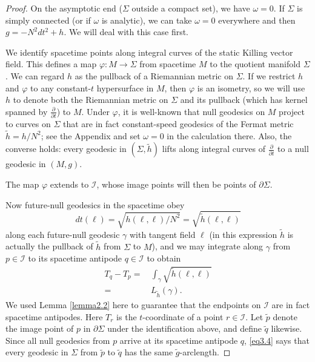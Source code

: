 \documentclass[12pt]{amsart}
\numberwithin{equation}{section}
\begin{document}
\begin{proof}
On the asymptotic end ($\Sigma$ outside a compact set), we have $\omega=0$. If $\Sigma$ is simply connected (or if $\omega$ is analytic), we can take $\omega=0$ everywhere and then $g=-N^2dt^2+h$. We will deal with this case first.

We identify spacetime points along integral curves of the static Killing vector field. This defines a map $\varphi:M\to \Sigma$ from spacetime $M$ to the quotient manifold $\Sigma$. We can regard $h$ as the pullback of a Riemannian metric on $\Sigma$. If we restrict $h$ and $\varphi$ to any constant-$t$ hypersurface in $M$, then $\varphi$ is an isometry, so we will use $h$ to denote both the Riemannian metric on $\Sigma$ and its pullback (which has kernel spanned by $\frac{\partial}{\partial t}$) to $M$. Under $\varphi$, it is well-known that null geodesics on $M$ project to curves on $\Sigma$ that are in fact constant-speed geodesics of the Fermat metric ${\tilde h}=h/N^2$; see the Appendix and set $\omega=0$ in the calculation there. Also, the converse holds: every geodesic in $(\Sigma,{\tilde h})$ lifts along integral curves of $\frac{\partial}{\partial t}$ to a null geodesic in $(M,g)$.

The map $\varphi$ extends to ${\mathcal I}$, whose image points will then be points of $\partial \Sigma$.

Now future-null geodesics in the spacetime obey
\begin{equation}
\label{eq3.3}
dt(\ell)=\sqrt{h(\ell,\ell)/N^2}=\sqrt{{\tilde h}(\ell,\ell)}
\end{equation}
along each future-null geodesic $\gamma$ with tangent field $\ell$ (in this expression ${\tilde h}$ is actually the pullback of ${\tilde h}$ from $\Sigma$ to $M$), and we may integrate along $\gamma$ from $p\in {\mathcal I}$ to its spacetime antipode $q\in {\mathcal I}$ to obtain
\begin{equation}
\label{eq3.4}
\begin{split}
T_q-T_p=&\, \int_{\gamma} \sqrt{{\tilde h}(\ell,\ell)}\\
=&\,  L_{\tilde h}(\gamma) .
\end{split}
\end{equation}
We used Lemma \ref{lemma2.2} here to guarantee that the endpoints on ${\mathcal I}$ are in fact spacetime antipodes. Here $T_r$ is the $t$-coordinate of a point $r\in {\mathcal I}$. Let ${\tilde p}$ denote the image point of $p$ in $\partial \Sigma$ under the identification above, and define ${\tilde q}$ likewise. Since all null geodesics from $p$ arrive at its spacetime antipode $q$, \eqref{eq3.4} says that every geodesic in $\Sigma$ from ${\tilde p}$ to ${\tilde q}$ has the same ${\tilde g}$-arclength.


\end{proof}
\end{document}
